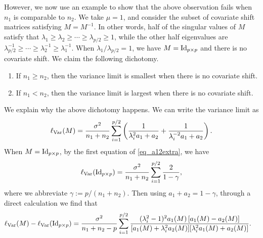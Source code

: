 However, we now use an example to show that the above observation fails when $n_1$ is comparable to $n_2$. We take $\mu =1$, and consider the subset of covariate shift matrices satisfying $M=M^{-1}$. In other words, half of the singular values of $M$ satisfy that $\lambda_1 \ge \lambda_2\ge \cdots \ge \lambda_{p/2} \ge 1$, while the other half eigenvalues are $\lambda_{p/2}^{-1}\ge \cdots \ge \lambda_2^{-1} \ge \lambda_1^{-1}$. When $\lambda_1/\lambda_{p/2} = 1$, we have $M=\operatorname{Id}_{p\times p}$ and there is no covariate shift.
We claim the following dichotomy.
\begin{enumerate}
	\item If $n_1 \ge n_2$, then the variance limit is smallest when there is no covariate shift.
	\item If $n_1 < n_2$, then the variance limit is largest when there is no covariate shift.
\end{enumerate}
We explain why the above dichotomy happens. We can write the variance limit as
$$\ell_{\operatorname{Var}}(M)=\frac{\sigma^2}{ n_1+n_2 }\sum_{i=1}^{p/2}\left( \frac{1}{\lambda_i^{2} a_1 + a_2} + \frac1{\lambda_i^{-2} a_1 + a_2} \right) .$$
When $M=\operatorname{Id}_{p\times p}$, by the first equation of \eqref{eq_a12extra}, we have
$$\ell_{\operatorname{Var}}(\operatorname{Id}_{p\times p})=\frac{\sigma^2}{ n_1+n_2 }\sum_{i=1}^{p/2} \frac{2}{1-\gamma} , $$
where we abbreviate $\gamma:=p/(n_1+n_2)$. Then using $a_1+a_2=1-\gamma$, through a direct calculation we find that %
\begin{align*}
\ell_{\var}(M) - \ell_{\var}(\id_{p\times p})%
&= \frac{\sigma^2 }{ n_1+n_2-p} \sum_{i=1}^{p/2} \frac{(\lambda_i^2-1)^2 a_1(M) \left[ a_1(M) - a_2(M)\right] }{[a_1(M)+\lambda_i^2 a_2(M)][\lambda_i^2 a_1(M)+a_2(M)]} .
\end{align*}

